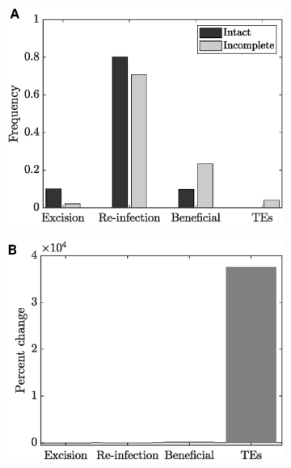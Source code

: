 \begin{figure}[H]
    \centering
     \begin{subfigure}[t]{0.50\textwidth} 
    \includegraphics[scale=0.50]{BiTe1o}
     \end{subfigure}\hfill
         \begin{subfigure}[t]{0.50\textwidth}
    \includegraphics[scale=0.50]{BiTe2o.eps}
    \end{subfigure}\hfill\\  \begin{subfigure}[t]{0.50\textwidth}

\end{subfigure}
\end{figure}
